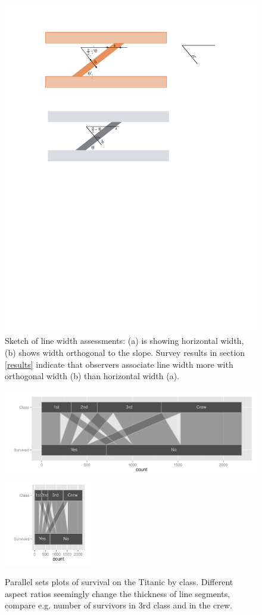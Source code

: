 \documentclass[journal]{vgtc}\usepackage{graphicx, color}
\begin{document}
\begin{figure}[htbp]
\begin{center}
\includegraphics[width=0.6\linewidth]{images/linewidth}
\end{center}
\caption{\label{fig:linewidth}Sketch of line width assessments: (a) is showing  horizontal width, (b) shows  width orthogonal to the slope. Survey results in section \ref{results}  indicate that observers associate line width more with  orthogonal width (b) than horizontal width (a).}
\end{figure}





\begin{figure}[htbp]
\begin{center}
\includegraphics[height=1.5in]{images/aspect31-titanic.pdf}
\includegraphics[height=1.5in]{images/aspect33-titanic.pdf}
\end{center}
\caption{\label{fig:aspect}Parallel sets plots of survival on the Titanic by class. Different aspect ratios  seemingly change the thickness of line segments, compare e.g. number of survivors in 3rd class and in the crew. }
\end{figure}
\end{document}
